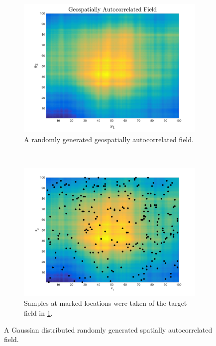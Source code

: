 \begin{figure}[ht!]
    \centering
    \begin{subfigure}[t]{0.5\textwidth}
        \centering
        \includegraphics[width=\linewidth]{figures/generated_field.png}
        \captionsetup{skip=0.5\baselineskip,size=footnotesize}
        \caption{A randomly generated geospatially autocorrelated field.}
		\label{fig:gen_field}
    \end{subfigure}%
    ~ 
    \begin{subfigure}[t]{0.5\textwidth}
        \centering
        \includegraphics[width=\linewidth]{figures/sampled_generated_field.png}
		\captionsetup{skip=0.5\baselineskip,size=footnotesize}
		\caption{Samples at marked locations were taken of the target field in \ref{fig:gen_field}.}
		\label{fig:sampled_field}
    \end{subfigure}
    \caption{A Gaussian distributed randomly generated spatially autocorrelated field.}
    \label{fig:generated_and_sampled_field}
\end{figure}

